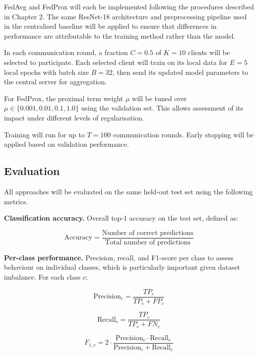 \documentclass[12pt,openany,a4paper]{book}
\begin{document}
FedAvg and FedProx will each be implemented following the procedures described in Chapter 2. The same ResNet-18 architecture and preprocessing pipeline used in the centralised baseline will be applied to ensure that differences in performance are attributable to the training method rather than the model. 

In each communication round, a fraction $C = 0.5$ of $K = 10$ clients will be selected to participate. Each selected client will train on its local data for $E = 5$ local epochs with batch size $B = 32$, then send its updated model parameters to the central server for aggregation. 

For FedProx, the proximal term weight $\mu$ will be tuned over $\mu \in \{0.001, 0.01, 0.1, 1.0\}$ using the validation set. This allows assessment of its impact under different levels of regularisation.

Training will run for up to $T = 100$ communication rounds. Early stopping will be applied based on validation performance.

\subsection{Evaluation}

All approaches will be evaluated on the same held-out test set using the following metrics.

\textbf{Classification accuracy.} Overall top-1 accuracy on the test set, defined as:

\begin{equation}
\text{Accuracy} = \frac{\text{Number of correct predictions}}{\text{Total number of predictions}}
\end{equation}

\textbf{Per-class performance.} Precision, recall, and F1-score per class to assess behaviour on individual classes, which is particularly important given dataset imbalance. For each class $c$:

\begin{equation}
\text{Precision}_c = \frac{TP_c}{TP_c + FP_c}
\end{equation}

\begin{equation}
\text{Recall}_c = \frac{TP_c}{TP_c + FN_c}
\end{equation}

\begin{equation}
F_{1,c} = 2 \cdot \frac{\text{Precision}_c \cdot \text{Recall}_c}{\text{Precision}_c + \text{Recall}_c}
\end{equation}
\end{document}
